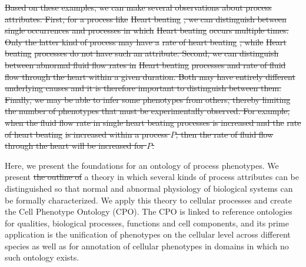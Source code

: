 \documentclass{bioinfo}
\providecommand{\DIFdel}[1]{{\protect\color{red}\sout{#1}}}                      %
\providecommand{\DIFdelbegin}{} %
\providecommand{\DIFdelend}{} %
\begin{document}
\DIFdelbegin \DIFdel{Based on these examples, we can make several observations about
process attributes. First, for a process like }%
\DIFdel{Heart beating}%
\DIFdel{, we
can distinguish between single occurrences and processes in which }%
\DIFdel{Heart beating}%
\DIFdel{occurs multiple times. Only the latter kind of
process may have a }%
\DIFdel{rate of heart beating}%
\DIFdel{, while }%
\DIFdel{Heart
  beating}%
\DIFdel{processes do not have such an attribute. Second, we can
distinguish between abnormal fluid flow rates in }%
\DIFdel{Heart beating}%
\DIFdel{processes and rate of fluid flow through the heart within a given
duration. Both may have entirely different underlying causes and it is
therefore important to distinguish between them. Finally, we may be
able to infer some phenotypes from others, thereby limiting the number
of phenotypes that must be experimentally observed. For example, when
the fluid flow rate in single heart beating processes is increased and
the }%
\DIFdel{rate of heart beating}%
\DIFdel{is increased within a process $P$,
then the rate of fluid flow through the heart will be increased for
$P$.
}\DIFdelend %

Here, we present the foundations for an ontology of process
phenotypes. We present \DIFdelbegin \DIFdel{the outline of }\DIFdelend a theory in which several kinds of process
attributes can be distinguished so that normal and abnormal physiology
of biological systems can be formally characterized. We apply this
theory to cellular processes and create the Cell Phenotype Ontology
(CPO). The CPO is linked to reference ontologies for qualities,
biological processes, functions and cell components, and its prime
application is the unification of phenotypes on the cellular level
across different species as well as for annotation of cellular
phenotypes in domains in which no such ontology exists.
\end{document}
